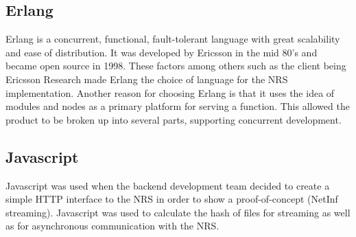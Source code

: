 \subsection{Erlang}
Erlang is a concurrent, functional, fault-tolerant language with great scalability and ease of distribution. It was developed by Ericsson in the mid 80's and became open source in 1998.\cite{otpInAction} These factors among others such as the client being Ericsson Research made Erlang the choice of language for the NRS implementation.
Another reason for choosing Erlang is that it uses the idea of modules and nodes as a primary platform for serving a function. This allowed the product to be broken up into several parts, supporting concurrent development.
\subsection{Javascript}
Javascript \cite{javascript} was used when the backend development team decided to create a simple HTTP interface to the NRS in order to show a proof-of-concept (NetInf streaming). Javascript was used to calculate the hash of files for streaming as well as for asynchronous communication with the NRS.

